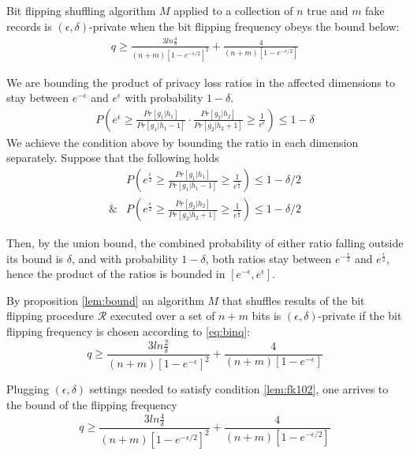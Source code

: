 \documentclass[11pt]{article}
\newcommand{\cR}{\mathcal{R}}
\begin{document}
\begin{prop}
Bit flipping shuffling algorithm $M$ applied to a collection of $n$ true and $m$ fake records is $(\epsilon, \delta)$-private when the bit flipping frequency obeys the bound below:
\begin{align}
q \ge \frac  { 3  ln\frac{4}{\delta}}  { (n + m) \left [ 1 - e^{-\epsilon/2}\right ] ^2}  + \frac{4}{(n + m) \left [ 1 - e^{-\epsilon/2}\right ] } 
\end{align}
\begin{pf}
We are bounding the product of privacy loss ratios in the affected dimensions to stay between $e^{-\epsilon}$ and $e^\epsilon$ with probability $1-\delta$.
\begin{align} \label{lem:fk101}
P \left (   e^\epsilon \ge \frac{  Pr[ g_1 | h_1]  } {  Pr[ g_1 | h_1 - 1]  } \cdot \frac{  Pr[ g_2 | h_2]  } {  Pr[ g_2 | h_2 + 1]  }  \ge \frac{1}{e^\epsilon} \right ) \le 1 - \delta
\end{align}
We achieve the condition above by bounding the ratio in each dimension separately.  Suppose that the following holds
\begin{align} \label{lem:fk102}
& P \left (   e^\frac{\epsilon}{2} \ge \frac{  Pr[ g_1 | h_1]  } {  Pr[ g_1 | h_1 - 1] }  \ge \frac{1}{e^\frac{\epsilon}{2}} \right ) \le 1 - \delta/2 \\
\& & P \left (   e^\frac{\epsilon}{2} \ge \frac{  Pr[ g_2 | h_2]  } {  Pr[ g_2 | h_2 + 1]  }  \ge \frac{1}{e^\frac{\epsilon}{2}} \right ) \le 1 - \delta/2 
\end{align}

Then, by the union bound, the combined probability of either ratio falling outside its bound is $\delta$, and with probability $1-\delta$, both ratios stay between $e^{-\frac{\epsilon}{2}}$ and $e^\frac{\epsilon}{2}$, hence the product of the ratios is bounded in $[ e^{-\epsilon}, e^\epsilon]$.   

By proposition \ref{lem:bound} an algorithm $M$ that shuffles results of the bit flipping procedure  $\cR$ executed over a set of $n+m$ bits is $(\epsilon, \delta)$-private if the bit flipping frequency is chosen according to \ref{eq:binq}:
\[ q \ge \frac  { 3  ln\frac{2}{\delta}}  { (n+m) \left [ 1 - e^{-\epsilon}\right ] ^2}  + \frac{4}{(n+m) \left [ 1 - e^{-\epsilon}\right ] } \]

Plugging  $(\epsilon, \delta)$ settings needed to satisfy condition \ref{lem:fk102}, one arrives to the  bound of the flipping frequency
\begin{equation}
q \ge \frac  { 3  ln\frac{4}{\delta}}  { (n + m) \left [ 1 - e^{-\epsilon/2}\right ] ^2}  + \frac{4}{(n + m) \left [ 1 - e^{-\epsilon/2}\right ] }  \label{eq:genbound}
\end{equation}
\end{pf}
\end{prop}
\end{document}
